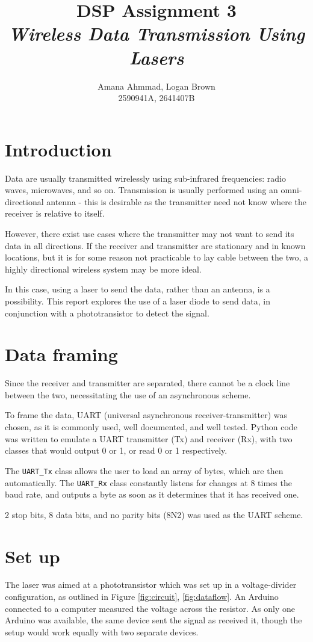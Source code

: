 \documentclass{article}
\title{DSP Assignment 3 \\ \textit{Wireless Data Transmission Using Lasers}}
\author{Amana Ahmmad, Logan Brown \\ 2590941A, 2641407B}
\begin{document}
\maketitle

\begin{multicols}{2}

\section{Introduction}
Data are usually transmitted wirelessly using sub-infrared frequencies: radio waves, microwaves, and so on. Transmission is usually performed using an omni-directional antenna - this is desirable as the transmitter need not know where the receiver is relative to itself.  

However, there exist use cases where the transmitter may not want to send its data in all directions. If the receiver and transmitter are stationary and in known locations, but it is for some reason not practicable to lay cable between the two, a highly directional wireless system may be more ideal. 

In this case, using a laser to send the data, rather than an antenna, is a possibility. This report explores the use of a laser diode to send data, in conjunction with a phototransistor to detect the signal.

\section{Data framing}
Since the receiver and transmitter are separated, there cannot be a clock line between the two, necessitating the use of an asynchronous scheme. 

To frame the data, UART (universal asynchronous receiver-transmitter) was chosen, as it is commonly used, well documented, and well tested. Python code was written to emulate a UART transmitter (Tx) and receiver (Rx), with two classes that would output 0 or 1, or read 0 or 1 respectively.

The \texttt{UART\_Tx} class allows the user to load an array of bytes, which are then  automatically. The \texttt{UART\_Rx} class constantly listens for changes at 8 times the baud rate, and outputs a byte as soon as it determines that it has received one.

2 stop bits, 8 data bits, and no parity bits (8N2) was used as the UART scheme.

\section{Set up}
The laser was aimed at a phototransistor which was set up in a voltage-divider configuration, as outlined in Figure \ref{fig:circuit}, \ref{fig:dataflow}. An Arduino connected to a computer measured the voltage across the resistor. As only one Arduino was available, the same device sent the signal as received it, though the setup would work equally with two separate devices. 


\end{multicols}
\end{document}
